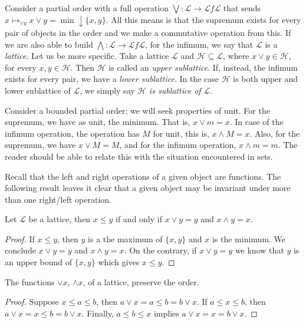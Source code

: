 \documentclass [12pt]{book}
\begin{document}
Consider a partial order with a full operation $\bigvee:\mathcal L\rightarrow\mathcal L f\mathcal L$ that sends $x\mapsto_{\vee y}x\vee y=\min\downarrow\{x,y\}$. All this means is that the supremum exists for every pair of objects in the order and we make a commutative operation from this. If we are also able to build $\bigwedge:\mathcal L\rightarrow\mathcal Lf\mathcal L$, for the infimum, we say that $\mathcal L$ is a \textit{lattice}. Let us be more specific. Take a lattice $\mathcal L$ and $\mathcal H\subseteq\mathcal L$, where $x\vee y\in\mathcal H$, for every $x,y\in\mathcal H$. Then $\mathcal H$ is called an \textit{upper sublattice}. If, instead, the infimum exists for every pair, we have a \textit{lower sublattice}. In the case $\mathcal H$ is both upper and lower sublattice of $\mathcal L$, we simply say $\mathcal H$ \textit{is sublattice of} $\mathcal L$.

Consider a bounded partial order; we will seek properties of unit. For the supremum, we have as unit, the minimum. That is, $x\vee m=x$. In case of the infimum operation, the operation has  $M$ for unit, this is, $x\wedge M=x$. Also, for the supremum, we have $x\vee M=M$, and for the infimum operation, $x\wedge m=m$. The reader should be able to relate this with the situation encountered in sets.

Recall that the left and right operations of a given object are functions. The following result leaves it clear that a given object may be invariant under more than one right/left operation.

\begin{proposition}Let $\mathcal L$ be a lattice, then $x\leq y$ if and only if $x\vee y=y$ and $x\wedge y=x$.\label{sup td}\end{proposition}

\begin{proof}If $x\leq y$, then $y$ is a the maximum of $\{x,y\}$ and $x$ is the minimum. We conclude $x\vee y=y$ and $x\wedge y=x$. On the contrary, if $x\vee y =y$ we know that $y$ is an upper bound of $\{x,y\}$ which gives $x\leq y$.\end{proof}

\begin{proposition}The functions $\vee x$, $\wedge x$, of a lattice, preserve the order.\label{sup sb}\end{proposition}

\begin{proof}Suppose $x\leq a\leq b$, then $a\vee x=a\leq b=b\vee x$. If $a\leq x\leq b$, then $a\vee x=x\leq b=b\vee x$. Finally, $a\leq b\leq x$ implies $a\vee x=x=b\vee x$.\end{proof}
\end{document}
